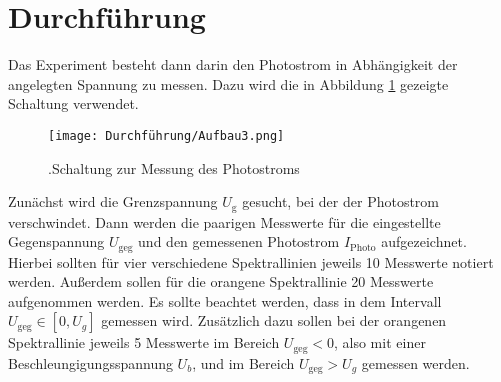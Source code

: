 \section{Durchführung}
Das Experiment besteht dann darin den Photostrom in Abhängigkeit der angelegten Spannung zu messen.
Dazu wird die in Abbildung \ref{fig:aufbau3} gezeigte Schaltung verwendet.

\begin{figure}[h]
    \centering
    \texttt{[image: Durchführung/Aufbau3.png]}
    \caption{.Schaltung zur Messung des Photostroms}
    \label{fig:aufbau3}
\end{figure}

Zunächst wird die Grenzspannung $U_\text{g}$ gesucht, bei der der Photostrom verschwindet.
Dann werden die paarigen Messwerte für die eingestellte Gegenspannung $U_\text{geg}$ und den gemessenen Photostrom $I_\text{Photo}$ aufgezeichnet.
Hierbei sollten für vier verschiedene Spektrallinien jeweils 10 Messwerte notiert werden.
Außerdem sollen für die orangene Spektrallinie 20 Messwerte aufgenommen werden.
Es sollte beachtet werden, dass in dem Intervall $U_\text{geg} \in [0,U_g]$ gemessen wird.
Zusätzlich dazu sollen bei der orangenen Spektrallinie jeweils 5 Messwerte im Bereich $U_\text{geg} < 0$, also mit einer Beschleungigungsspannung $U_b$, und im Bereich $U_\text{geg} > U_g$ gemessen werden.
